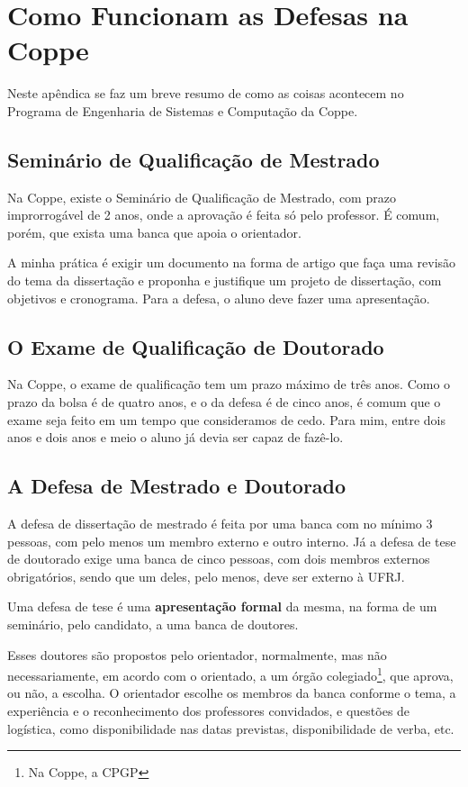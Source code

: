 \chapter{Como Funcionam as Defesas na Coppe}
\label{app:coppedef}

Neste apêndica se faz um breve resumo de como as coisas acontecem no Programa de Engenharia de Sistemas e Computação da Coppe.

\section{Seminário de Qualificação de Mestrado}

Na Coppe, existe o Seminário de Qualificação de Mestrado, com prazo improrrogável de 2 anos, onde a aprovação é feita só pelo professor. É comum, porém, que exista uma banca que apoia o orientador.

A minha prática é exigir um documento na forma de artigo que faça uma revisão do tema da dissertação e proponha e justifique um projeto de dissertação, com objetivos e cronograma. Para a defesa, o aluno deve fazer uma apresentação.

\section{O Exame de Qualificação de Doutorado}

Na Coppe, o exame de qualificação tem um prazo máximo de três anos. Como o prazo da bolsa é de quatro anos, e o da defesa é de cinco anos, é comum que o exame seja feito em um tempo que consideramos de cedo. Para mim, entre dois anos e dois anos e meio o aluno já devia ser capaz de fazê-lo.


\section{A Defesa de Mestrado e Doutorado}

A defesa de dissertação de mestrado é feita por uma banca com no mínimo 3 pessoas, com pelo menos um membro externo e outro interno. 
Já a defesa de tese de doutorado exige uma banca de cinco pessoas, com dois membros externos obrigatórios, sendo que um deles, pelo menos, deve ser externo à UFRJ.

Uma defesa de tese é uma \textbf{apresentação formal} da mesma, na forma de um seminário, pelo candidato, a uma banca de doutores.

Esses doutores são propostos pelo orientador, normalmente, mas não necessariamente, em acordo com o orientado, a um órgão colegiado\footnote{Na Coppe, a CPGP}, que aprova, ou não, a escolha. O orientador escolhe os membros da banca conforme o tema, a experiência e o reconhecimento dos professores convidados, e questões de logística, como disponibilidade nas datas previstas, disponibilidade de verba, etc.

